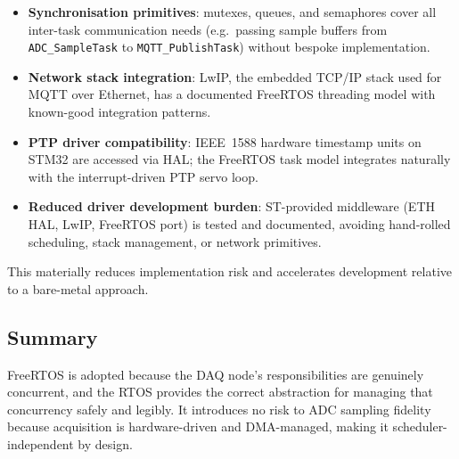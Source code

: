 \begin{itemize}[noitemsep]
    \item \textbf{Synchronisation primitives}: mutexes, queues, and semaphores cover
          all inter-task communication needs (e.g.\ passing sample buffers from
          \texttt{ADC\_SampleTask} to \texttt{MQTT\_PublishTask}) without bespoke
          implementation.
    \item \textbf{Network stack integration}: LwIP, the embedded TCP/IP stack used
          for MQTT over Ethernet, has a documented FreeRTOS threading model with
          known-good integration patterns.
    \item \textbf{PTP driver compatibility}: IEEE~1588 hardware timestamp units on
          STM32 are accessed via HAL; the FreeRTOS task model integrates naturally with
          the interrupt-driven PTP servo loop.
    \item \textbf{Reduced driver development burden}: ST-provided middleware
          (ETH HAL, LwIP, FreeRTOS port) is tested and documented, avoiding hand-rolled
          scheduling, stack management, or network primitives.
\end{itemize}

This materially reduces implementation risk and accelerates development relative to a
bare-metal approach.

\subsection{Summary}

FreeRTOS is adopted because the DAQ node's responsibilities are genuinely concurrent,
and the RTOS provides the correct abstraction for managing that concurrency safely and
legibly. It introduces no risk to ADC sampling fidelity because acquisition is
hardware-driven and DMA-managed, making it scheduler-independent by design.
